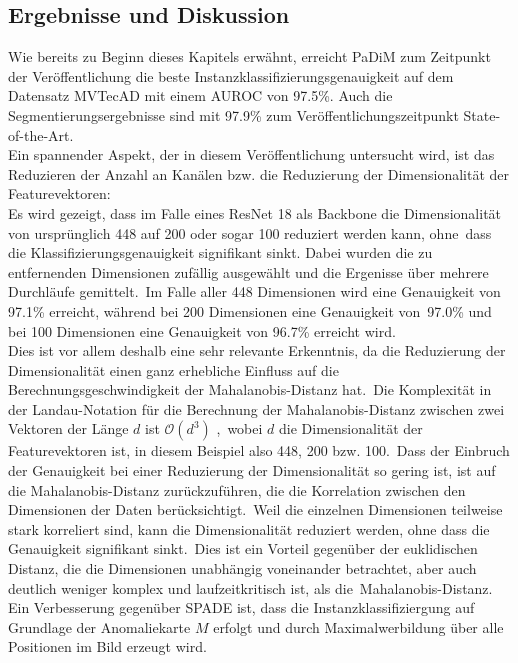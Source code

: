 \subsection{Ergebnisse und Diskussion}\label{subsec:PaDiMResults}
Wie bereits zu Beginn dieses Kapitels erwähnt, erreicht PaDiM zum Zeitpunkt der Veröffentlichung die beste Instanzklassifizierungsgenauigkeit auf dem Datensatz MVTecAD mit einem AUROC von \num{97,5}\%. 
Auch die Segmentierungsergebnisse sind mit \num{97,9}\% zum Veröffentlichungszeitpunkt State-of-the-Art.\\
Ein spannender Aspekt, der in diesem Veröffentlichung untersucht wird, ist das Reduzieren der Anzahl an Kanälen bzw. die Reduzierung der Dimensionalität der Featurevektoren:\\
Es wird gezeigt, dass im Falle eines ResNet 18 als Backbone die Dimensionalität von ursprünglich \num{448} auf \num{200} oder sogar \num{100} reduziert werden kann, ohne\
dass die Klassifizierungsgenauigkeit signifikant sinkt. Dabei wurden die zu entfernenden Dimensionen zufällig ausgewählt und die Ergenisse über mehrere Durchläufe gemittelt.\
Im Falle aller \num{448} Dimensionen wird eine Genauigkeit von \num{97,1}\% erreicht, während bei \num{200} Dimensionen eine Genauigkeit von\ 
\num{97,0}\% und bei \num{100} Dimensionen eine Genauigkeit von \num{96,7}\% erreicht wird.\\
Dies ist vor allem deshalb eine sehr relevante Erkenntnis, da die Reduzierung der Dimensionalität einen ganz erhebliche Einfluss auf die Berechnungsgeschwindigkeit der Mahalanobis-Distanz hat.\
Die Komplexität in der Landau-Notation für die Berechnung der Mahalanobis-Distanz zwischen zwei Vektoren der Länge $d$ ist $\mathcal{O}(d^{3})$ \cite{bishop2006pattern},\
wobei $d$ die Dimensionalität der Featurevektoren ist, in diesem Beispiel also \num{448}, \num{200} bzw. \num{100}.\
Dass der Einbruch der Genauigkeit bei einer Reduzierung der Dimensionalität so gering ist, ist auf die Mahalanobis-Distanz zurückzuführen, die die Korrelation zwischen den Dimensionen der Daten berücksichtigt.\
Weil die einzelnen Dimensionen teilweise stark korreliert sind, kann die Dimensionalität reduziert werden, ohne dass die Genauigkeit signifikant sinkt.\
Dies ist ein Vorteil gegenüber der euklidischen Distanz, die die Dimensionen unabhängig voneinander betrachtet, aber auch deutlich weniger komplex und laufzeitkritisch ist, als die\
Mahalanobis-Distanz.\\
Ein Verbesserung gegenüber SPADE ist, dass die Instanzklassifiziergung auf Grundlage der Anomaliekarte $M$ erfolgt und durch Maximalwerbildung über alle Positionen im Bild erzeugt wird. \
